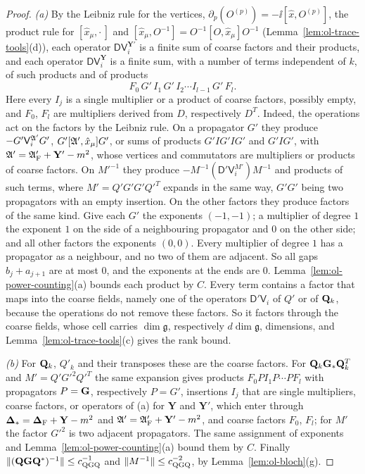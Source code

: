 \begin{proof}
\emph{(a)} By the Leibniz rule for the vertices, $\partial_p(O^{(p)})=-\ii[\hat x,O^{(p)}]$, the product rule for $[\hat x_\mu,\cdot\,]$ and $[\hat x_\mu,O^{-1}]=O^{-1}[O,\hat x_\mu]O^{-1}$ (Lemma~\ref{lem:ol-trace-tools}(d)), each operator $\mathsf D\mathsf V_i^{\mathbf Y'}$ is a finite sum of coarse factors and their products, and each operator $\mathsf D\mathsf V_i^{\mathbf Y}$ is a finite sum, with a number of terms independent of $k$, of such products and of products
\[
F_0\,G'\,I_1\,G'\,I_2\cdots I_{l-1}\,G'\,F_l .
\]
Here every $I_j$ is a single multiplier or a product of coarse factors, possibly empty, and $F_0$, $F_l$ are multipliers derived from $D$, respectively $D^T$. Indeed, the operations act on the factors by the Leibniz rule. On a propagator $G'$ they produce $-G'\mathsf V^{\mathfrak A'}_iG'$, $G'[\mathfrak A',\hat x_\mu]G'$, or sums of products $G'IG'IG'$ and $G'IG'$, with $\mathfrak A'=\mathfrak A'_{\rm F}+\mathbf Y'-m^2$, whose vertices and commutators are multipliers or products of coarse factors. On $M'^{-1}$ they produce $-M^{-1}(\mathsf D'\mathsf V_i^{M'})M^{-1}$ and products of such terms, where $M'=Q'G'G'Q'^T$ expands in the same way, $G'G'$ being two propagators with an empty insertion. On the other factors they produce factors of the same kind. Give each $G'$ the exponents $(-1,-1)$; a multiplier of degree $1$ the exponent $1$ on the side of a neighbouring propagator and $0$ on the other side; and all other factors the exponents $(0,0)$. Every multiplier of degree $1$ has a propagator as a neighbour, and no two of them are adjacent. So all gaps $b_j+a_{j+1}$ are at most $0$, and the exponents at the ends are $0$. Lemma~\ref{lem:ol-power-counting}(a) bounds each product by $C$. Every term contains a factor that maps into the coarse fields, namely one of the operators $\mathsf D'\mathsf V_i$ of $Q'$ or of $\mathbf Q_k$, because the operations do not remove these factors. So it factors through the coarse fields, whose cell carries $\dim\mathfrak g$, respectively $d\dim\mathfrak g$, dimensions, and Lemma~\ref{lem:ol-trace-tools}(c) gives the rank bound.

\emph{(b)} For $\mathbf Q_k$, $Q'_k$ and their transposes these are the coarse factors. For $\mathbf Q_k\mathbf G_*\mathbf Q_k^T$ and $M'=Q'G'^2Q'^T$ the same expansion gives products $F_0PI_1P\cdots PF_l$ with propagators $P=\mathbf G$, respectively $P=G'$, insertions $I_j$ that are single multipliers, coarse factors, or operators of (a) for $\mathbf Y$ and $\mathbf Y'$, which enter through $\boldsymbol{\Delta}_*=\boldsymbol{\Delta}_{\rm F}+\mathbf Y-m^2$ and $\mathfrak A'=\mathfrak A'_{\rm F}+\mathbf Y'-m^2$, and coarse factors $F_0$, $F_l$; for $M'$ the factor $G'^2$ is two adjacent propagators. The same assignment of exponents and Lemma~\ref{lem:ol-power-counting}(a) bound them by $C$. Finally $\|(\mathbf Q\mathbf G\mathbf Q^*)^{-1}\|\le c_{\rm QGQ}^{-1}$ and $\|M^{-1}\|\le c_{\rm QGQ}^{-2}$, by Lemma~\ref{lem:ol-bloch}(g).
\end{proof}

